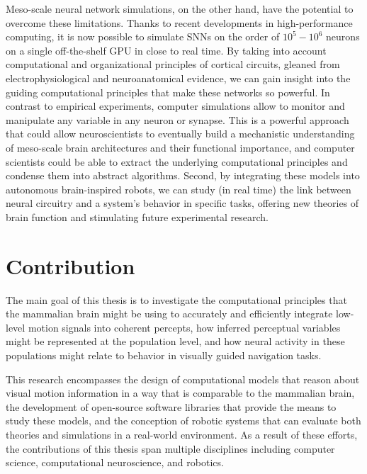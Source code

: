 Meso-scale neural network simulations, on the other hand,
have the potential to overcome these limitations.
Thanks to recent developments in high-performance computing, 
it is now possible to simulate \acfp{SNN} on the order of $10^5-10^6$ neurons
on a single off-the-shelf \acf{GPU} in close to real time.
By taking into account computational and organizational principles of cortical
circuits, gleaned from electrophysiological and neuroanatomical evidence,
we can gain insight into the guiding computational principles that make these
networks so powerful.
In contrast to empirical experiments, computer simulations allow to
monitor and manipulate any variable in any neuron or synapse.
This is a powerful approach that could allow
neuroscientists to eventually build a mechanistic understanding
of meso-scale brain architectures and their functional importance,
and computer scientists could be able to extract the underlying computational
principles and condense them into abstract algorithms.
Second, by integrating these models into autonomous brain-inspired robots,
we can study (in real time) the link between neural circuitry 
and a system's behavior in specific tasks, 
offering new theories of brain function and
stimulating future experimental research.



\section{Contribution}
\label{sec:intro|contribution}

The main goal of this thesis is to investigate the computational principles that
the mammalian brain might be using to accurately and efficiently integrate
low-level motion signals into coherent percepts, 
how inferred perceptual variables might be represented at the population level,
and how neural activity in these populations might relate to behavior in
visually guided navigation tasks.

This research encompasses the design of computational models that reason about
visual motion information in a way that is comparable to the mammalian brain,
the development of open-source software libraries 
that provide the means to study these models,
and the conception of robotic systems that can evaluate 
both theories and simulations in a real-world environment.
As a result of these efforts, the contributions of this thesis span multiple
disciplines including computer science, computational neuroscience, and robotics.

